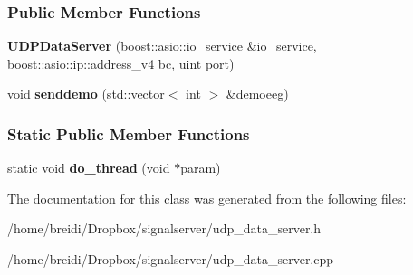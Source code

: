 \subsubsection*{Public Member Functions}
\begin{DoxyCompactItemize}
\item 
\hypertarget{class_u_d_p_data_server_a61003c5600834b45fd8da70a6214aadd}{
{\bfseries UDPDataServer} (boost::asio::io\_\-service \&io\_\-service, boost::asio::ip::address\_\-v4 bc, uint port)}
\label{class_u_d_p_data_server_a61003c5600834b45fd8da70a6214aadd}

\item 
\hypertarget{class_u_d_p_data_server_a6299b1c9be810e4a7595f1fe4bab26b2}{
void {\bfseries senddemo} (std::vector$<$ int $>$ \&demoeeg)}
\label{class_u_d_p_data_server_a6299b1c9be810e4a7595f1fe4bab26b2}

\end{DoxyCompactItemize}
\subsubsection*{Static Public Member Functions}
\begin{DoxyCompactItemize}
\item 
\hypertarget{class_u_d_p_data_server_adb53a2d75b1117f1eb20a5fa99605034}{
static void {\bfseries do\_\-thread} (void $\ast$param)}
\label{class_u_d_p_data_server_adb53a2d75b1117f1eb20a5fa99605034}

\end{DoxyCompactItemize}


The documentation for this class was generated from the following files:\begin{DoxyCompactItemize}
\item 
/home/breidi/Dropbox/signalserver/udp\_\-data\_\-server.h\item 
/home/breidi/Dropbox/signalserver/udp\_\-data\_\-server.cpp\end{DoxyCompactItemize}
